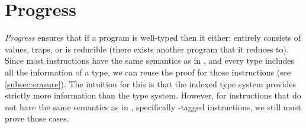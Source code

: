 \section{Progress}
\emph{Progress} ensures that if a program is well-typed then it either: entirely consists of values, traps, or is reducible (\ie there exists another program that it reduces to).
Since most \name instructions have the same semantics as in \wasm, and every \name type includes all the information of a \wasm type, we can reuse the \wasm proof for those instructions (see \ref{subsec:erasure}).
The intuition for this is that the \name indexed type system provides strictly more information than the \wasm type system.
However, for \name instructions that do not have the same semantics as in \wasm, specifically \prechk-tagged instructions, we still must prove those cases.

